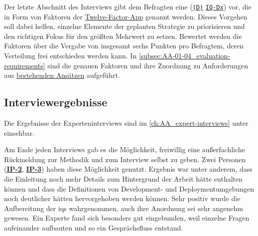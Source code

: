 Der letzte Abschnitt des Interviews gibt dem Befragten eine \textbf{} (\texttt{\hyperref[subsubsec:04-01-02-02_form]{(D)}} \textrightarrow \texttt{\hyperref[subsec:AA-01-04_evaluation-requirements]{IQ-Dx}}) vor, die in Form von Faktoren der \hyperref[sec:03-05_basic-idea-of-twelve-factor-app]{Twelve-Factor-App} genannt werden. Dieses Vorgehen soll dabei helfen, einzelne Elemente der geplanten  Strategie zu priorisieren und den richtigen Fokus für den größten Mehrwert zu setzen. Bewertet werden die Faktoren über die Vergabe von insgesamt sechs Punkten pro Befragtem, deren Verteilung frei entschieden werden kann. In \autoref{subsec:AA-01-04_evaluation-requirements} sind die genauen Faktoren und ihre Zuordnung zu Anforderungen aus \hyperref[ch:03_examination-of-existing-approaches]{bestehenden Ansätzen} aufgeführt.

\subsection{Interviewergebnisse}
\label{subsec:04-01-04_interview-results}

Die Ergebnisse der Experteninterviews sind im \autoref{ch:AA_expert-interviews} unter  einsehbar.

Am Ende jeden Interviews gab es die Möglichkeit, freiwillig eine außerfachliche Rückmeldung zur Methodik und zum Interview selbst zu geben. Zwei Personen (\textbf{\hyperref[sec:AA-02_interview-persons]{IP-2}}, \textbf{\hyperref[sec:AA-02_interview-persons]{IP-3}}) haben diese Möglichkeit genutzt. Ergebnis war unter anderem, dass die Einleitung noch mehr Details zum Hintergrund der Arbeit hätte enthalten können und dass die Definitionen von Development- und Deploymentumgebungen noch deutlicher hätten hervorgehoben werden können. Sehr positiv wurde die Aufbereitung der \Glspl{iq} wahrgenommen, auch ihre Anordnung sei sehr angenehm gewesen. Ein Experte fand sich besonders gut eingebunden, weil einzelne Fragen aufeinander aufbauten und so ein Gesprächsfluss entstand.

